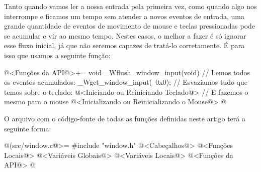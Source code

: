 
Tanto quando vamos ler a nossa entrada pela primeira vez, como quando
algo nos interrompe e ficamos um tempo sem atender a novos eventos de
entrada, uma grande quantidade de eventos de movimento de mouse e
teclas pressionadas pode se acumular e vir ao mesmo tempo. Nestes
casos, o melhor a fazer é só ignorar esse fluxo inicial, já que não
seremos capazes de tratá-lo corretamente. É para isso que usamos a
seguinte função:

\iniciocodigo
@<Funções da API@>+=
void _Wflush_window_input(void){
  // Lemos todos os eventos acumulados:
  _Wget_window_input(~0x0);
  // Esvaziamos tudo que temos sobre o teclado:
  @<Iniciando ou Reiniciando Teclado@>
  // E fazemos o mesmo para o mouse
  @<Inicializando ou Reinicializando o Mouse@>
}
@
\fimcodigo



O arquivo com o código-fonte de todas as funções definidas neste
artigo terá a seguinte forma:

\iniciocodigo
@(src/window.c@>=
#include "window.h"
@<Cabeçalhos@>
@<Funções Locais@>
@<Variáveis Globais@>
@<Variáveis Locais@>
@<Funções da API@>
@
\fimcodigo



\fim
